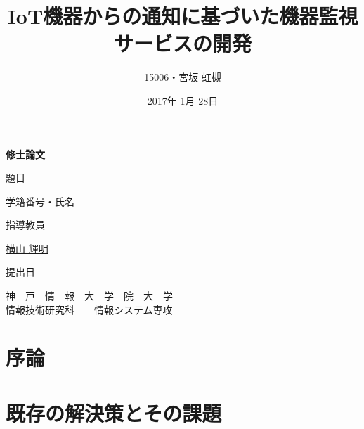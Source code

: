\documentclass[a4paper]{jreport}
\begin{document}
\makeatletter

\title{IoT機器からの通知に基づいた機器監視サービスの開発}
\author{15006・宮坂 虹槻}
\date{2017年 1月 28日}
\def\@teacher{横山 輝明}

\begin{titlepage}\begin{center}
\thispagestyle{plain}
{\Huge \textbf{修士論文} \par}
\vspace{1.5cm}
{\LARGE\gt 題目 \par}
{\LARGE\gt \underline{\@title} \par}
\vspace{2.5cm}
{\LARGE\gt 学籍番号・氏名 \par}
\vspace{1.5cm}
{\LARGE \underline{\@author} \par}
\vspace{1.5cm}
{\LARGE\gt 指導教員 \par}
\vspace{1.5cm}
{\LARGE\gt \underline{\@teacher} \par}
\vspace{1.5cm}
{\LARGE\gt 提出日 \par}
\vspace{1.5cm}
{\LARGE\gt \underline{\@date} \par}
\vspace{1.5cm}
{\Large\gt
神　戸　情　報　大　学　院　大　学\\
情報技術研究科　　情報システム専攻\\
\par}
\end{center}\end{titlepage}
\restoregeometry
\makeatother

\tableofcontents

\begin{abstract}
\thispagestyle{plain}

\end{abstract}

\chapter{序論}


\chapter{既存の解決策とその課題}

\end{document}
